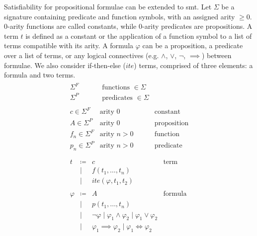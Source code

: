 \documentclass[runningheads]{llncs}
\begin{document}
Satisfiability for propositional formulae can be extended to \gls{smt}.
Let $\Sigma$ be a signature containing predicate and function symbols, with an assigned arity $\ge 0$.
0-arity functions are called constants, while 0-arity predicates are propositions.
A term $t$ is defined as a constant or the application of a function symbol to a list of terms compatible with its arity.
A formula $\varphi$ can be a proposition, a predicate over a list of terms, or any logical connectives (e.g. $\land$, $\lor$, $\neg$, $\implies$) between formulae.
We also consider if-then-else ($ite$) terms, comprised of three elements: a formula and two terms.
\begin{equation}
    \label{eq:smt-notations}
    \begin{gathered}
        \begin{array}{lll}
            \Sigma^F         & \text{ functions } \in \Sigma                       \\
            \Sigma^P         & \text{ predicates } \in \Sigma                      \\
            \\
            c \in \Sigma^F   & \text{arity } 0                & \text{constant}    \\
            A \in \Sigma^P   & \text{arity } 0                & \text{proposition} \\
            f_n \in \Sigma^F & \text{arity } n > 0            & \text{function}    \\
            p_n \in \Sigma^P & \text{arity } n > 0            & \text{predicate}   \\
        \end{array}
        \\
        \begin{array}{lrll}
            t       & \coloneqq & c                                                                           & \text{term}    \\
                    & \mid      & f(t_1, \ldots, t_n)                                                                          \\
                    & \mid      & ite(\varphi, t_1, t_2)                                                                       \\
            \\
            \varphi & \coloneqq & A                                                                           & \text{formula} \\
                    & \mid      & p(t_1, \ldots, t_n)                                                                          \\
                    & \mid      & \neg\varphi    \mid \varphi_1 \land \varphi_2 \mid \varphi_1 \lor \varphi_2                  \\
                    & \mid      & \varphi_1 \implies \varphi_2 \mid \varphi_1 \iff \varphi_2                                   \\
        \end{array}
    \end{gathered}
\end{equation}
\end{document}
